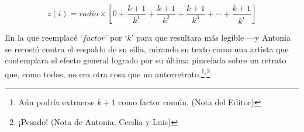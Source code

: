 \[
  z(i)=radio \times
  \left[0+\frac{k+1}{k^1}+\frac{k+1}{k^2}+\frac{k+1}{k^3}+\cdots+\frac{k+1}{k^i}\right]
\]

\guillemotright En la que reemplacé `$factor$' por `$k$' para que
resultara más legible ---y Antonia se recostó contra el respaldo de su
silla, mirando su texto como una artista que contemplara el efecto
general logrado por su última pincelada sobre un retrato que, como
todos, no era otra cosa que un autorretrato.\footnote{Aún podría
  extraerse $k+1$ como factor común. (Nota del
  Editor)}$^,$\footnote{¡Pesado! (Nota de Antonia, Cecilia y Luis)}








